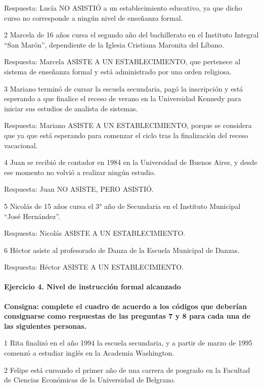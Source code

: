 \documentclass[
  openany]{book}
\begin{document}
Respuesta: Lucía NO ASISTIÓ a un establecimiento educativo, ya que dicho curso no corresponde a ningún nivel de enseñanza formal.

2 Marcela de 16 años cursa el segundo año del bachillerato en el Instituto Integral ``San Marón'', dependiente de la Iglesia Cristiana Maronita del Líbano.

Respuesta: Marcela ASISTE A UN ESTABLECIMIENTO, que pertenece al sistema de enseñanza formal y está administrado por una orden religiosa.

3 Mariano terminó de cursar la escuela secundaria, pagó la inscripción y está esperando a que finalice el receso de verano en la Universidad Kennedy para iniciar sus estudios de analista de sistemas.

Respuesta: Mariano ASISTE A UN ESTABLECIMIENTO, porque se considera que ya que está esperando para comenzar el ciclo tras la finalización del receso vacacional.

4 Juan se recibió de contador en 1984 en la Universidad de Buenos Aires, y desde ese momento no volvió a realizar ningún estudio.

Respuesta: Juan NO ASISTE, PERO ASISTIÓ.

5 Nicolás de 15 años cursa el 3° año de Secundaria en el Instituto Municipal ``José Hernández''.

Respuesta: Nicolás ASISTE A UN ESTABLECIMIENTO.

6 Héctor asiste al profesorado de Danza de la Escuela Municipal de Danzas.

Respuesta: Héctor ASISTE A UN ESTABLECIMIENTO.

\hypertarget{ejercicio-4.-nivel-de-instrucciuxf3n-formal-alcanzado-1}{%
\paragraph{Ejercicio 4. Nivel de instrucción formal alcanzado}\label{ejercicio-4.-nivel-de-instrucciuxf3n-formal-alcanzado-1}}

\textbf{Consigna: complete el cuadro de acuerdo a los códigos que deberían consignarse como respuestas de las preguntas 7 y 8 para cada una de las siguientes personas.}

1 Rita finalizó en el año 1994 la escuela secundaria, y a partir de marzo de 1995 comenzó a estudiar inglés en la Academia Washington.

2 Felipe está cursando el primer año de una carrera de posgrado en la Facultad de Ciencias Económicas de la Universidad de Belgrano.
\end{document}
